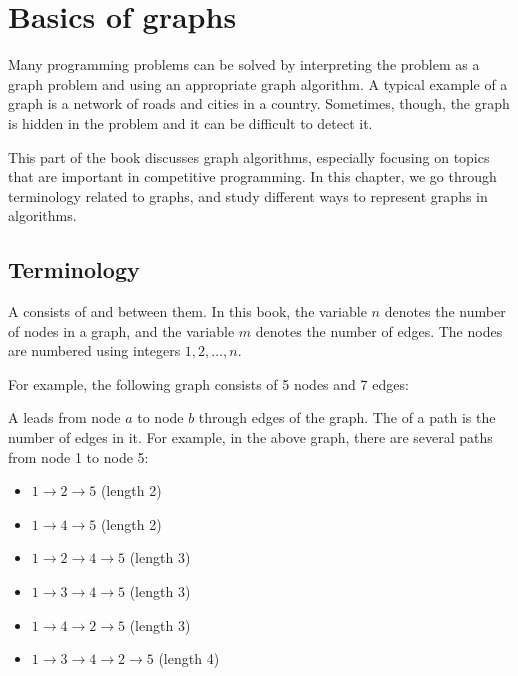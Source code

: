 \chapter{Basics of graphs}

Many programming problems can be solved by
interpreting the problem as a graph problem
and using an appropriate graph algorithm.
A typical example of a graph is a network
of roads and cities in a country.
Sometimes, though, the graph is hidden
in the problem and it can be difficult to detect it.

This part of the book discusses graph algorithms,
especially focusing on topics that
are important in competitive programming.
In this chapter, we go through terminology
related to graphs,
and study different ways to represent graphs in algorithms.

\section{Terminology}


A  consists of 
and  between them.
In this book,
the variable $n$ denotes the number of nodes
in a graph, and the variable $m$ denotes
the number of edges.
The nodes are numbered
using integers $1,2,\ldots,n$.

For example, the following graph consists of 5 nodes and 7 edges:

\begin{center}
\end{center}


A  leads from node $a$ to node $b$
through edges of the graph.
The  of a path is the number of
edges in it.
For example, in the above graph, there
are several paths from node 1 to node 5:

\begin{itemize}
\item $1 \rightarrow 2 \rightarrow 5$ (length 2)
\item $1 \rightarrow 4 \rightarrow 5$ (length 2)
\item $1 \rightarrow 2 \rightarrow 4 \rightarrow 5$ (length 3)
\item $1 \rightarrow 3 \rightarrow 4 \rightarrow 5$ (length 3)
\item $1 \rightarrow 4 \rightarrow 2 \rightarrow 5$ (length 3)
\item $1 \rightarrow 3 \rightarrow 4 \rightarrow 2 \rightarrow 5$ (length 4)
\end{itemize}

